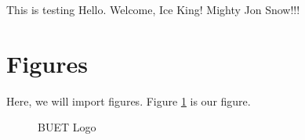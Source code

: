\documentclass{book}
\newcommand{\testcommand}{Hello}
\newcommand{\anothertestcommand}[2]{Welcome, #2! Mighty #1!!!}
\begin{document}
This is testing \testcommand. \anothertestcommand{Jon Snow}{Ice King}

\section{Figures}

Here, we will import figures. Figure \ref{fig:bl} is our figure.

\begin{figure}[h!]
    \centering
    \caption{BUET Logo}
    \label{fig:bl}
\end{figure}

\lipsum
\end{document}

